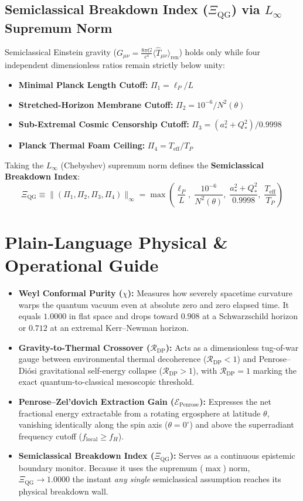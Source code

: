 \documentclass[11pt,a4paper]{article}
\begin{document}
\subsection{Semiclassical Breakdown Index ($\Xi_{\mathrm{QG}}$) via $L_\infty$ Supremum Norm}
Semiclassical Einstein gravity ($G_{\mu\nu} = \frac{8\pi G}{c^4} \langle \hat{T}_{\mu\nu} \rangle_{\mathrm{ren}}$) holds only while four independent dimensionless ratios remain strictly below unity:
\begin{itemize}
    \item \textbf{Minimal Planck Length Cutoff:} $\Pi_1 = \ell_P / L$
    \item \textbf{Stretched-Horizon Membrane Cutoff:} $\Pi_2 = 10^{-6} / N^2(\theta)$
    \item \textbf{Sub-Extremal Cosmic Censorship Cutoff:} $\Pi_3 = (a_*^2 + Q_*^2) / 0.9998$
    \item \textbf{Planck Thermal Foam Ceiling:} $\Pi_4 = T_{\mathrm{eff}} / T_P$
\end{itemize}
Taking the $L_\infty$ (Chebyshev) supremum norm defines the \textbf{Semiclassical Breakdown Index}:
\begin{equation}
\Xi_{\mathrm{QG}} \equiv \big\|(\Pi_1, \Pi_2, \Pi_3, \Pi_4)\big\|_\infty = \max\left(\frac{\ell_P}{L},\; \frac{10^{-6}}{N^2(\theta)},\; \frac{a_*^2 + Q_*^2}{0.9998},\; \frac{T_{\mathrm{eff}}}{T_P}\right)
\end{equation}

\section{Plain-Language Physical \& Operational Guide}

\begin{itemize}
    \item \textbf{Weyl Conformal Purity ($\chi$):} Measures how severely spacetime curvature warps the quantum vacuum even at absolute zero and zero elapsed time. It equals $1.0000$ in flat space and drops toward $0.908$ at a Schwarzschild horizon or $0.712$ at an extremal Kerr--Newman horizon.
    \item \textbf{Gravity-to-Thermal Crossover ($\mathcal{R}_{\mathrm{DP}}$):} Acts as a dimensionless tug-of-war gauge between environmental thermal decoherence ($\mathcal{R}_{\mathrm{DP}} < 1$) and Penrose--Diósi gravitational self-energy collapse ($\mathcal{R}_{\mathrm{DP}} > 1$), with $\mathcal{R}_{\mathrm{DP}} = 1$ marking the exact quantum-to-classical mesoscopic threshold.
    \item \textbf{Penrose--Zel'dovich Extraction Gain ($\mathcal{E}_{\mathrm{Penrose}}$):} Expresses the net fractional energy extractable from a rotating ergosphere at latitude $\theta$, vanishing identically along the spin axis ($\theta = 0^\circ$) and above the superradiant frequency cutoff ($f_{\mathrm{local}} \ge f_H$).
    \item \textbf{Semiclassical Breakdown Index ($\Xi_{\mathrm{QG}}$):} Serves as a continuous epistemic boundary monitor. Because it uses the supremum ($\max$) norm, $\Xi_{\mathrm{QG}} \to 1.0000$ the instant \emph{any single} semiclassical assumption reaches its physical breakdown wall.
\end{itemize}
\end{document}
